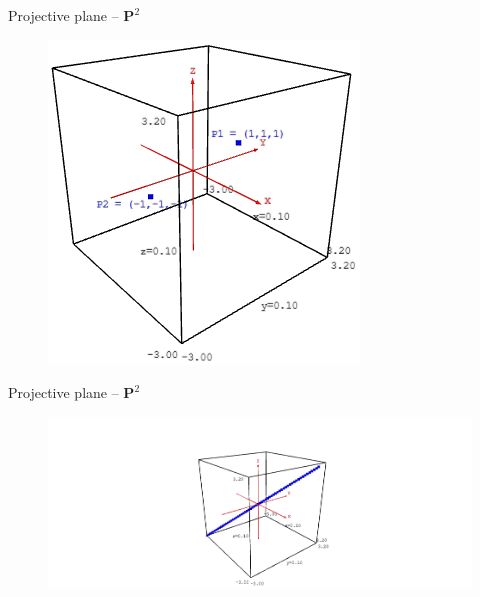 \documentclass[aspectratio=169,xcolor=dvipsnames]{beamer}
\begin{document}
\begin{frame}{Projective plane -- $\mathbf{P}^2$}
\begin{figure}
    \centering
    \href{https://doktor-ziel.github.io/ECC/projective-plane-02.html}{\includegraphics[height=0.6\textheight]{projective-plane-02.png}}
\end{figure}
\end{frame}


\begin{frame}{Projective plane -- $\mathbf{P}^2$}
\begin{figure}
    \centering
    \href{https://doktor-ziel.github.io/ECC/projective-plane-03.html}{\includegraphics[height=0.6\textheight]{projective-plane-03.png}}
\end{figure}
\end{frame}
\end{document}
